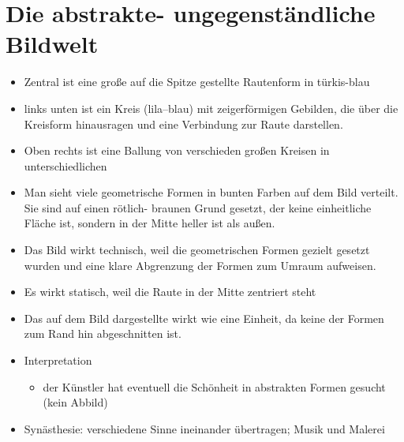 \section{Die abstrakte- ungegenständliche Bildwelt}
\begin{itemize}
	\item Zentral ist eine große auf die Spitze gestellte Rautenform in türkis-blau
	\item links unten ist ein Kreis (lila--blau) mit zeigerförmigen Gebilden, die über die Kreisform
	hinausragen und eine Verbindung zur Raute darstellen.
	\item Oben rechts ist eine Ballung von verschieden großen Kreisen in unterschiedlichen
	\item Man sieht viele geometrische Formen in bunten Farben auf dem Bild verteilt.
	Sie sind auf einen rötlich- braunen Grund gesetzt, der keine einheitliche Fläche ist,
	sondern in der Mitte heller ist als außen.
	\item Das Bild wirkt technisch, weil die geometrischen Formen gezielt gesetzt wurden und eine
	klare Abgrenzung der Formen zum Umraum aufweisen.
	\item Es wirkt statisch, weil die Raute in der Mitte zentriert steht
	\item Das auf dem Bild dargestellte wirkt wie eine Einheit, da keine der Formen zum Rand hin abgeschnitten ist.
	\item Interpretation
	\begin{itemize}
		\item der Künstler hat eventuell die Schönheit in abstrakten Formen gesucht (kein Abbild)
	\end{itemize}
	\item Synästhesie: verschiedene Sinne ineinander übertragen; \zB Musik und Malerei
\end{itemize}
